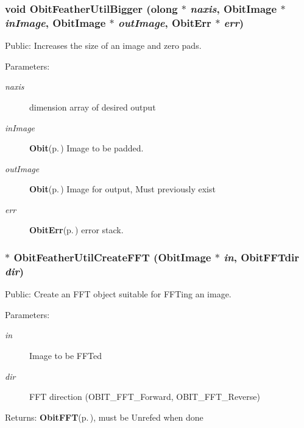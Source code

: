 \subsubsection{\setlength{\rightskip}{0pt plus 5cm}void Obit\-Feather\-Util\-Bigger ({\bf olong} $\ast$ {\em naxis}, {\bf Obit\-Image} $\ast$ {\em in\-Image}, {\bf Obit\-Image} $\ast$ {\em out\-Image}, {\bf Obit\-Err} $\ast$ {\em err})}\label{ObitFeatherUtil_8h_a4}


Public: Increases the size of an image and zero pads. 

\begin{Desc}
\item[Parameters:]
\begin{description}
\item[{\em naxis}]dimension array of desired output \item[{\em in\-Image}]{\bf Obit}{\rm (p.\,\pageref{structObit})} Image to be padded. \item[{\em out\-Image}]{\bf Obit}{\rm (p.\,\pageref{structObit})} Image for output, Must previously exist \item[{\em err}]{\bf Obit\-Err}{\rm (p.\,\pageref{structObitErr})} error stack. \end{description}
\end{Desc}
\subsubsection{$\ast$ Obit\-Feather\-Util\-Create\-FFT ({\bf Obit\-Image} $\ast$ {\em in}, Obit\-FFTdir {\em dir})}\label{ObitFeatherUtil_8h_a0}


Public: Create an FFT object suitable for FFTing an image. 

\begin{Desc}
\item[Parameters:]
\begin{description}
\item[{\em in}]Image to be FFTed \item[{\em dir}]FFT direction (OBIT\_\-FFT\_\-Forward, OBIT\_\-FFT\_\-Reverse) \end{description}
\end{Desc}
\begin{Desc}
\item[Returns:]{\bf Obit\-FFT}{\rm (p.\,\pageref{structObitFFT})}, must be Unrefed when done \end{Desc}
